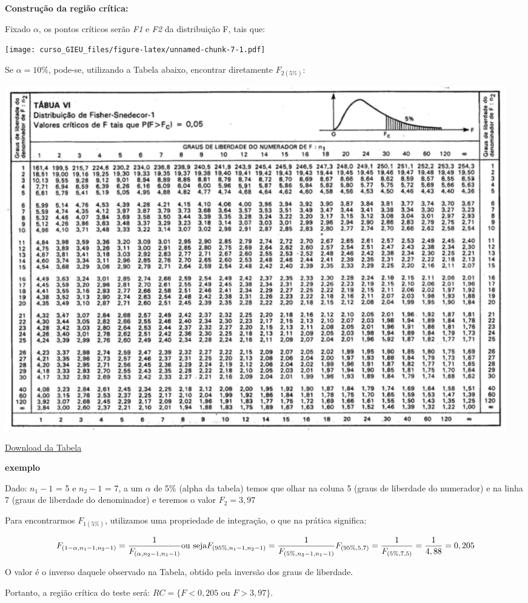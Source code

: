 \documentclass[
]{book}
\begin{document}
\textbf{Construção da região crítica:}

Fixado \(\alpha\), os pontos críticos serão \emph{F1} e \emph{F2} da distribuição F, tais que:

\texttt{[image: curso\_GIEU\_files/figure-latex/unnamed-chunk-7-1.pdf]}

Se \(\alpha = 10\%\), pode-se, utilizando a Tabela abaixo, encontrar diretamente \(F_{2(5\%)}\):

\includegraphics{tabF.png}

\href{https://github.com/arpanosso/ExpAgr_2020/raw/master/TabelaF.pdf}{Download da Tabela}

\textbf{exemplo}

Dado: \(n_1-1\) = 5 e \(n_2-1\) = 7, a um \(\alpha\) de 5\% (alpha da tabela) temos que olhar na coluna 5 (graus de liberdade do numerador) e na linha 7 (graus de liberdade do denominador) e teremos o valor \(F_2 = 3,97\)

Para encontrarmos \(F_{1(5\%)}\), utilizamos uma propriedade de integração, o que na prática significa:

\[
F_{(1-\alpha, n_1-1, n_2-1)} = \frac{1}{F_{(\alpha, n_2-1, n_1-1)}} \\
\text{ou seja} \\
F_{(95\%, n_1-1, n_2-1)} = \frac{1}{F_{(5\%, n_2-1, n_1-1)}} \\
F_{(95\%, 5, 7)} = \frac{1}{F_{(5\%, 7, 5)}} = \frac{1}{4,88} = 0,205
\]

O valor é o inverso daquele observado na Tabela, obtido pela inversão dos graus de liberdade.

Portanto, a região crítica do teste será: \(RC = \{ F < 0,205 \text{  ou  } F > 3,97 \}\).
\end{document}
